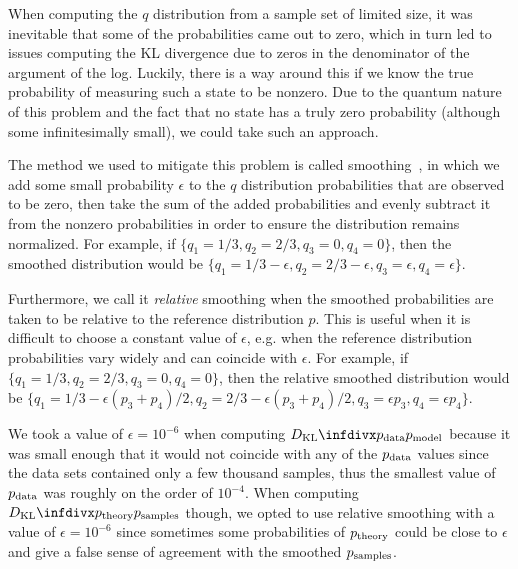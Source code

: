When computing the \( q \) distribution from a sample set of limited size, it was inevitable that some of the probabilities came out to zero, which in turn led to issues computing the KL divergence due to zeros in the denominator of the argument of the log.
Luckily, there is a way around this if we know the true probability of measuring such a state to be nonzero.
Due to the quantum nature of this problem and the fact that no state has a truly zero probability (although some infinitesimally small), we could take such an approach.

The method we used to mitigate this problem is called smoothing~\cite{han_kl_divergence}, in which we add some small probability \( \epsilon \) to the \( q \) distribution probabilities that are observed to be zero, then take the sum of the added probabilities and evenly subtract it from the nonzero probabilities in order to ensure the distribution remains normalized.
For example, if \( \{q_1 = 1/3, q_2 = 2/3, q_3 = 0, q_4 = 0\} \), then the smoothed distribution would be \( \{q_1 = 1/3 - \epsilon, q_2 = 2/3 - \epsilon, q_3 = \epsilon, q_4 = \epsilon\} \).

Furthermore, we call it \textit{relative} smoothing when the smoothed probabilities are taken to be relative to the reference distribution \( p \).
This is useful when it is difficult to choose a constant value of \( \epsilon \), e.g. when the reference distribution probabilities vary widely and can coincide with \( \epsilon \).
For example, if \( \{q_1 = 1/3, q_2 = 2/3, q_3 = 0, q_4 = 0\} \), then the relative smoothed distribution would be \( \{q_1 = 1/3 - \epsilon (p_3 + p_4)/2, q_2 = 2/3 - \epsilon (p_3 + p_4)/2, q_3 = \epsilon p_3, q_4 = \epsilon p_4\} \).

We took a value of \( \epsilon = 10^{-6} \) when computing \( \DKL{\pdata}{\pmodel} \) because it was small enough that it would not coincide with any of the \( p_{\text{data}} \) values since the data sets contained only a few thousand samples, thus the smallest value of \( p_{\text{data}} \) was roughly on the order of \( 10^{-4} \).
When computing \( \DKL{\ptheory}{\psamples} \) though, we opted to use relative smoothing with a value of \( \epsilon = 10^{-6} \) since sometimes some probabilities of \( p_{\text{theory}} \) could be close to \( \epsilon \) and give a false sense of agreement with the smoothed \( p_{\text{samples}} \).


